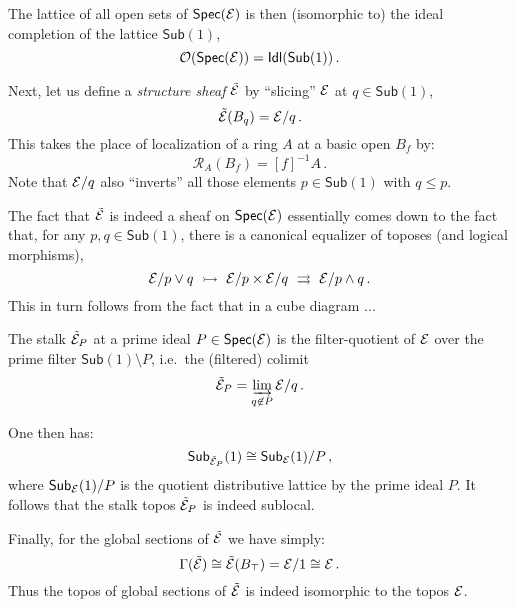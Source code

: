 \documentclass[lambek.tex]{subfiles}
\begin{document}
The lattice of all open sets of $\mathsf{Spec}(\mathcal{E})$ is then (isomorphic to) the ideal completion of the lattice $\mathsf{Sub}(1)$,
$$\mathcal{O}(\mathsf{Spec}(\mathcal{E})) = \mathsf{Idl}(\mathsf{Sub}(1))\,.$$

%



Next, let us define a \emph{structure sheaf} $\tilde{\mathcal{E}}$ by ``slicing'' $\mathcal{E}$ at $q \in\mathsf{Sub}(1)$,
\[
\tilde{\mathcal{E}}(B_q) = \mathcal{E}/q\,.
\]
This takes the place of localization of a ring $A$ at a basic open $B_f$ by:
\[
\mathcal{R}_A(B_f) = [f]^{-1}A\,.
\]
Note that $\mathcal{E}/q$ also ``inverts'' all those elements $p\in \mathsf{Sub}(1)$ with $q\leq p$. 

The fact that $\tilde{\mathcal{E}}$ is indeed a sheaf on $\mathsf{Spec}(\mathcal{E})$ essentially comes down to the fact that, for any $p, q \in \mathsf{Sub}(1)$, there is a canonical equalizer of toposes (and logical morphisms),
\[
\E/p\vee q\ \mono\ \E/p \times \E/q\ \rightrightarrows\ \E/p\wedge q \,.
\]
This in turn follows from the fact that in a cube diagram ... 

The stalk $\tilde{\mathcal{E}}_P$ at a prime ideal $P\in \mathsf{Spec}(\mathcal{E})$ is the filter-quotient of $\mathcal{E}$ over the prime filter $\mathsf{Sub}(1)\!\setminus\! P$, i.e.\ the (filtered) colimit
\[
\tilde{\mathcal{E}}_P = \varinjlim_{q\not\in P} \mathcal{E}/q\,.
\]


One then has:
\[
\mathsf{Sub}_{\tilde{\mathcal{E}}_P}(1)\cong \mathsf{Sub}_{\mathcal{E}}(1)/P\,,
\]
where $\mathsf{Sub}_{\mathcal{E}}(1)/P$ is the quotient distributive lattice by the prime ideal $P$.  
It follows that the stalk topos $\tilde{\mathcal{E}}_P$ is indeed sublocal.


Finally, for the global sections of $\tilde{\mathcal{E}}$ we  have simply:
$$\Gamma(\tilde{\mathcal{E}}) \cong \tilde{\mathcal{E}}(B_\top) = \mathcal{E}/1 \cong \mathcal{E}\,.$$
Thus the topos of global sections of $\tilde{\mathcal{E}}$ is indeed isomorphic to the topos $\mathcal{E}$.
\end{document}

